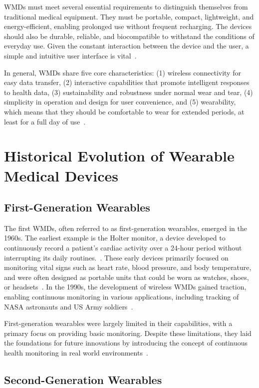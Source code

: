 \documentclass[journal]{IEEEtran}
\begin{document}
    WMDs must meet several essential requirements to distinguish themselves from traditional medical equipment. They must be portable, compact, lightweight, and energy-efficient, enabling prolonged use without frequent recharging. The devices should also be durable, reliable, and biocompatible to withstand the conditions of everyday use. Given the constant interaction between the device and the user, a simple and intuitive user interface is vital~\cite{Lu2020}.

    In general, WMDs share five core characteristics: (1) wireless connectivity for easy data transfer, (2) interactive capabilities that promote intelligent responses to health data, (3) sustainability and robustness under normal wear and tear, (4) simplicity in operation and design for user convenience, and (5) wearability, which means that they should be comfortable to wear for extended periods, at least for a full day of use~\cite{Lu2020}.

\section{Historical Evolution of Wearable Medical Devices}
\label{3.Historical}
    \subsection{First-Generation Wearables}

    The first WMDs, often referred to as first-generation wearables, emerged in the 1960s. The earliest example is the Holter monitor, a device developed to continuously record a patient's cardiac activity over a 24-hour period without interrupting its daily routines.~\cite{Ates2022}. These early devices primarily focused on monitoring vital signs such as heart rate, blood pressure, and body temperature, and were often designed as portable units that could be worn as watches, shoes, or headsets~\cite{Fotiadis2006}. In the 1990s, the development of wireless WMDs gained traction, enabling continuous monitoring in various applications, including tracking of NASA astronauts and US Army soldiers~\cite{Luo2024}.

    First-generation wearables were largely limited in their capabilities, with a primary focus on providing basic monitoring. Despite these limitations, they laid the foundations for future innovations by introducing the concept of continuous health monitoring in real world environments~\cite{Fotiadis2006}.

    \subsection{Second-Generation Wearables}
    
\end{document}
